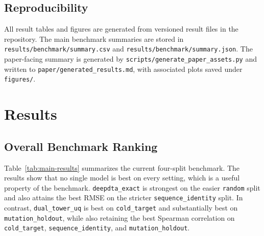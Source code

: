 \documentclass[11pt]{article}
\begin{document}
\subsection{Reproducibility}

All result tables and figures are generated from versioned result files in the
repository. The main benchmark summaries are stored in
\texttt{results/benchmark/summary.csv} and
\texttt{results/benchmark/summary.json}. The paper-facing summary is generated
by \texttt{scripts/generate\_paper\_assets.py} and written to
\texttt{paper/generated\_results.md}, with associated plots saved under
\texttt{figures/}.

\section{Results}

\subsection{Overall Benchmark Ranking}

Table~\ref{tab:main-results} summarizes the current four-split benchmark. The
results show that no single model is best on every setting, which is a useful
property of the benchmark. \texttt{deepdta\_exact} is strongest on the easier
\texttt{random} split and also attains the best RMSE on the stricter
\texttt{sequence\_identity} split. In contrast, \texttt{dual\_tower\_uq} is
best on \texttt{cold\_target} and substantially best on
\texttt{mutation\_holdout}, while also retaining the best Spearman correlation
on \texttt{cold\_target}, \texttt{sequence\_identity}, and
\texttt{mutation\_holdout}.
\end{document}
